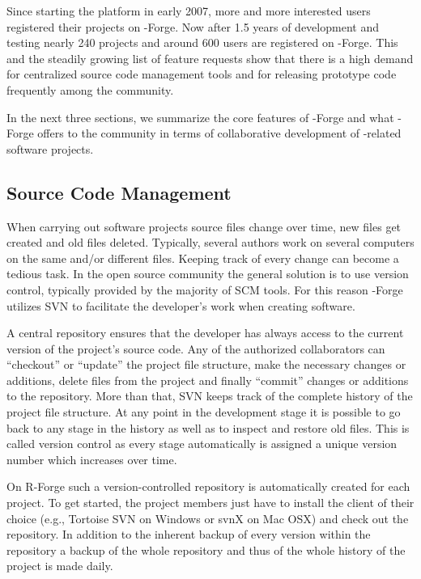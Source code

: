 Since starting the platform in early 2007, more
and more interested users registered their projects on \R{}-Forge. Now
after 1.5 years of development and testing nearly
240 projects and around 600  
users are registered on \R{}-Forge. This and the steadily growing list of
feature requests show that there is a high demand for centralized source code
management tools and for releasing prototype code frequently among the
\R{} community.

In the next three sections, we summarize the core features of
\R{}-Forge and what \R{}-Forge offers to the \R{} community in terms
of  collaborative development of \R{}-related software projects.

\subsection{Source Code Management}

When carrying out software projects source files change over time,
new files get created and old files deleted. Typically, several authors
work on several computers on the same and/or different files. Keeping
track of every change can become a tedious task. In the open source
community the general solution is to use version control, typically
provided by the majority of SCM tools. For this reason \R{}-Forge
utilizes SVN to facilitate the developer's work when creating
software.

A central repository ensures that the developer
has always access to the current version of the project's source
code. Any of the authorized collaborators can ``checkout'' or
``update'' the project
file structure, make the necessary changes or additions, delete
files from the project and finally ``commit'' changes or additions
to the repository. More than
that, SVN keeps track of the complete history of the project file
structure. At any point in the development stage it is possible to go
back to any stage in the history as well as to inspect and restore old
files. This is called version control as every stage automatically is
assigned a unique version number which increases over time. 

On R-Forge such a version-controlled repository is automatically
created for each project. To get started, the project members just
have to install the client of their choice (e.g., Tortoise SVN on
Windows or svnX on 
Mac OSX) and check out the repository. In addition to the inherent
backup of every version within the repository a backup of the whole
repository and thus of the whole history of the project is made daily. 

